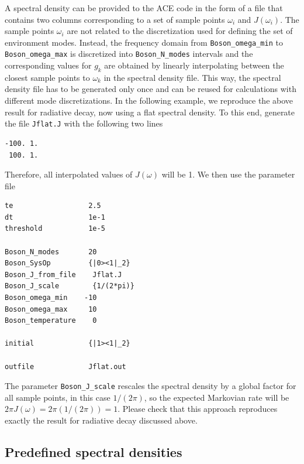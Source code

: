 \documentclass{scrartcl}
\begin{document}
A spectral density can be provided to the ACE code in the form of a file that
contains two columns corresponding to a set of sample points $\omega_i$ and
$J(\omega_i)$. The sample points $\omega_i$ are not related to the 
discretization used for defining the set of environment modes. Instead, the
frequency domain from \verb+Boson_omega_min+ to \verb+Boson_omega_max+ is
discretized into \verb+Boson_N_modes+ intervals and the corresponding values
for $g_k$ are obtained by linearly interpolating between the closest sample
points to $\omega_k$ in the spectral density file. This way, the spectral 
density file has to be generated only once and can be reused for calculations
with different mode discretizations. In the following example, we reproduce 
the above result for radiative decay, now using a flat spectral density. 
To this end, generate the file \texttt{Jflat.J} with the following two lines
\begin{verbatim}
-100. 1.
 100. 1.
\end{verbatim}
Therefore, all interpolated values of $J(\omega)$ will be 1. We then 
use the parameter file
\begin{verbatim}
te                  2.5
dt                  1e-1
threshold           1e-5

Boson_N_modes       20
Boson_SysOp         {|0><1|_2}
Boson_J_from_file    Jflat.J
Boson_J_scale        {1/(2*pi)}   
Boson_omega_min    -10
Boson_omega_max     10
Boson_temperature    0

initial             {|1><1|_2}

outfile             Jflat.out
\end{verbatim}

The parameter \verb+Boson_J_scale+ rescales the spectral density by a global
factor for all sample points, in this case $1/(2\pi)$, so the expected
Markovian rate will be $2\pi J(\omega)=2\pi (1/(2 \pi))=1$. Please check 
that this approach reproduces exactly the result for radiative decay 
discussed above.


\subsection{Predefined spectral densities}
\end{document}
